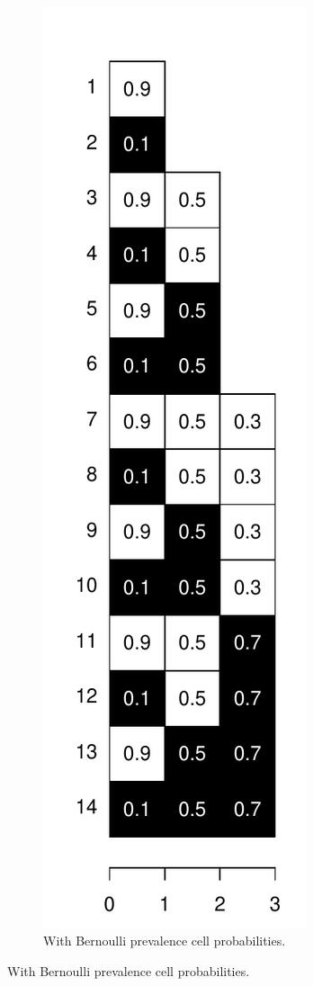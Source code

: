 \documentclass[a4paper]{article}
\begin{document}
\begin{figure}
\begin{subfigure}[b]{0.4\textwidth}
        \label{fig:b1}
    \end{subfigure}
    ~ 
    \begin{subfigure}[b]{0.4\textwidth}
        \includegraphics[scale=.5]{Figures/BernTrajProbs.pdf}
        \caption{With Bernoulli prevalence cell probabilities.}
        \label{fig:b2}
    \end{subfigure}
    

\end{figure}
\end{document}
